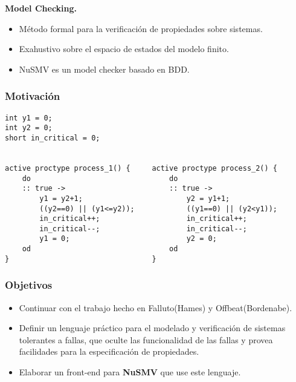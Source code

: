 \documentclass[serif]{beamer}
\begin{document}
\begin{frame}
{\Large \bfseries Model Checking.}
\begin{itemize}\itemsep15pt
\item Método formal para la verificación de propiedades sobre sistemas.
\item Exahustivo sobre el espacio de estados del modelo finito.
\item NuSMV es un model checker basado en BDD.
\end{itemize}
\end{frame}


\begin{frame}[fragile]
\frametitle{Motivación}
{\fontsize{9pt}{11pt}\selectfont
\begin{verbatim}
int y1 = 0;
int y2 = 0;
short in_critical = 0;


active proctype process_1() {     active proctype process_2() {
    do                                do
    :: true ->                        :: true ->
        y1 = y2+1;                        y2 = y1+1;
        ((y2==0) || (y1<=y2));            ((y1==0) || (y2<y1));
        in_critical++;                    in_critical++;
        in_critical--;                    in_critical--;
        y1 = 0;                           y2 = 0;
    od                                od
}                                 }
\end{verbatim}
}
\end{frame}

\begin{frame}
\frametitle{Objetivos}
\begin{itemize}\itemsep15pt
\item Continuar con el trabajo hecho en Falluto(Hames) y Offbeat(Bordenabe). 
\item Definir un lenguaje práctico para el modelado y verificación de 
sistemas tolerantes a fallas, que oculte las funcionalidad de las 
fallas y provea facilidades para la especificación de propiedades.
\item Elaborar un front-end para \textbf{NuSMV} que use este lenguaje.
\end{itemize}
\end{frame}
\end{document}
